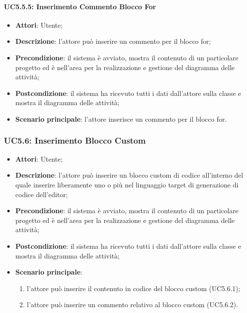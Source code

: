 \paragraph{UC5.5.5: Inserimento Commento Blocco For}
\label{UC5.5.5}
\begin{itemize}
	\item \textbf{Attori}: Utente;
	\item \textbf{Descrizione}: l'attore può inserire un commento per il blocco for;
	\item \textbf{Precondizione}: il sistema è avviato, mostra il contenuto di un particolare progetto ed è nell'area per la realizzazione e gestione del diagramma delle attività;
	\item \textbf{Postcondizione}: il sistema ha ricevuto tutti i dati dall'attore sulla classe e mostra il diagramma delle attività;
	\item \textbf{Scenario principale}: l'attore inserisce un commento per il blocco for.
\end{itemize}

\subsubsection{UC5.6: Inserimento Blocco Custom}
\label{UC5.6}
\begin{itemize}
	\item \textbf{Attori}: Utente;
	\item \textbf{Descrizione}: l'attore può inserire un blocco custom di codice all'interno del quale inserire liberamente uno o più  nel linguaggio target di generazione di codice dell'editor;
	\item \textbf{Precondizione}: il sistema è avviato, mostra il contenuto di un particolare progetto ed è nell'area per la realizzazione e gestione del diagramma delle attività;
	\item \textbf{Postcondizione}: il sistema ha ricevuto tutti i dati dall'attore sulla classe e mostra il diagramma delle attività;
	\item \textbf{Scenario principale}:
	\begin{enumerate}
		\item l'attore può inserire il contenuto in codice del blocco custom (UC5.6.1);
		\item l'attore può inserire un commento relativo al blocco custom (UC5.6.2).
	\end{enumerate}
\end{itemize}

